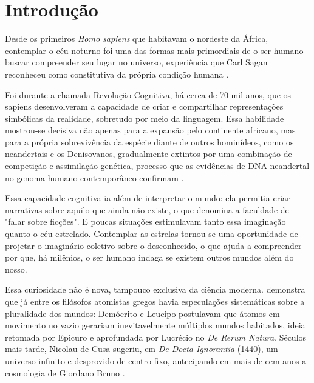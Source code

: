 \documentclass[
	12pt,
	openany,
	oneside,
	a4paper,
	english,
	brazil
]{abntex2}
\begin{document}
\tableofcontents*
\clearpage

\textual

\chapter{Introdução}\label{cap:introducao}

Desde os primeiros \textit{Homo sapiens} que habitavam o nordeste da África, contemplar o céu noturno foi uma das formas mais primordiais de o ser humano buscar compreender seu lugar no universo, experiência que Carl Sagan reconheceu como constitutiva da própria condição humana \cite{dick1982, harari2015, sagan1980}.

Foi durante a chamada Revolução Cognitiva, há cerca de 70 mil anos, que os sapiens desenvolveram a capacidade de criar e compartilhar representações simbólicas da realidade, sobretudo por meio da linguagem. Essa habilidade mostrou-se decisiva não apenas para a expansão pelo continente africano, mas para a própria sobrevivência da espécie diante de outros hominídeos, como os neandertais e os Denisovanos, gradualmente extintos por uma combinação de competição e assimilação genética, processo que as evidências de DNA neandertal no genoma humano contemporâneo confirmam \cite{harari2015}.

Essa capacidade cognitiva ia além de interpretar o mundo: ela permitia criar narrativas sobre aquilo que ainda não existe, o que  denomina a faculdade de "falar sobre ficções". E poucas situações estimulavam tanto essa imaginação quanto o céu estrelado. Contemplar as estrelas tornou-se uma oportunidade de projetar o imaginário coletivo sobre o desconhecido, o que ajuda a compreender por que, há milênios, o ser humano indaga se existem outros mundos além do nosso.

Essa curiosidade não é nova, tampouco exclusiva da ciência moderna.  demonstra que já entre os filósofos atomistas gregos havia especulações sistemáticas sobre a pluralidade dos mundos: Demócrito e Leucipo postulavam que átomos em movimento no vazio gerariam inevitavelmente múltiplos mundos habitados, ideia retomada por Epicuro e aprofundada por Lucrécio no \textit{De Rerum Natura}. Séculos mais tarde, Nicolau de Cusa sugeriu, em \textit{De Docta Ignorantia} (1440), um universo infinito e desprovido de centro fixo, antecipando em mais de cem anos a cosmologia de Giordano Bruno \cite{bruno1584}.
\end{document}
